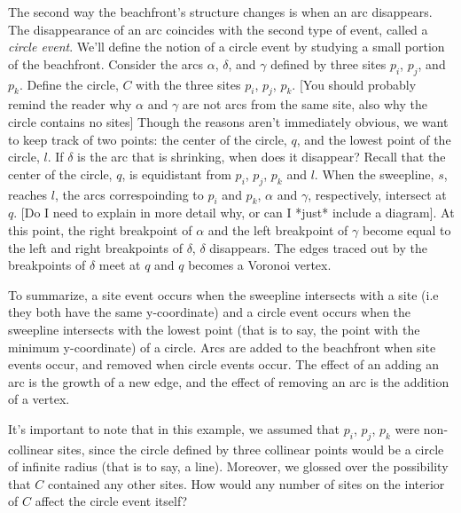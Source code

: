 \documentclass[12pt,twoside]{reedthesis}
\begin{document}
  The second way the beachfront's structure changes is when an arc disappears. The disappearance of an arc coincides with the second type of event, called a \emph{circle event}. We'll define the notion of a circle event by studying a small portion of the beachfront. Consider the arcs $\alpha$, $\delta$, and $\gamma$ defined by three sites $p_{i}$, $p_{j}$, and $p_{k}$. Define the circle, $C$ with the three sites $p_{i}$, $p_{j}$, $p_{k}$. [You should probably remind the reader why $\alpha$ and $\gamma$ are not arcs from the same site, also why the circle contains no sites] Though the reasons aren't immediately obvious, we want to keep track of two points: the center of the circle, $q$, and the lowest point of the circle, $l$. If $\delta$ is the arc that is shrinking, when does it disappear? Recall that the center of the circle, $q$, is equidistant from $p_{i}$, $p_{j}$, $p_{k}$ and $l$. When the sweepline, $s$, reaches $l$, the arcs correspoinding to $p_{i}$ and $p_{k}$, $\alpha$ and $\gamma$, respectively, intersect at $q$. [Do I need to explain in more detail why, or can I *just* include a diagram]. At this point, the right breakpoint of $\alpha$ and the left breakpoint of $\gamma$ become equal to the left and right breakpoints of $\delta$, $\delta$ disappears. The edges traced out by the breakpoints of $\delta$ meet at $q$ and $q$ becomes a Voronoi vertex.\par
  To summarize, a site event occurs when the sweepline intersects with a site (i.e they both have the same y-coordinate) and a circle event occurs when the sweepline intersects with the lowest point (that is to say, the point with the minimum y-coordinate) of a circle. Arcs are added to the beachfront when site events occur, and removed when circle events occur. The effect of an adding an arc is the growth of a new edge, and the effect of removing an arc is the addition of a vertex.\par
  It's important to note that in this example, we assumed that $p_{i}$, $p_{j}$, $p_{k}$ were non-collinear sites, since the circle defined by three collinear points would be a circle of infinite radius (that is to say, a line). Moreover, we glossed over the possibility that $C$ contained any other sites. How would any number of sites on the interior of $C$ affect the circle event itself? \par 
\end{document}
